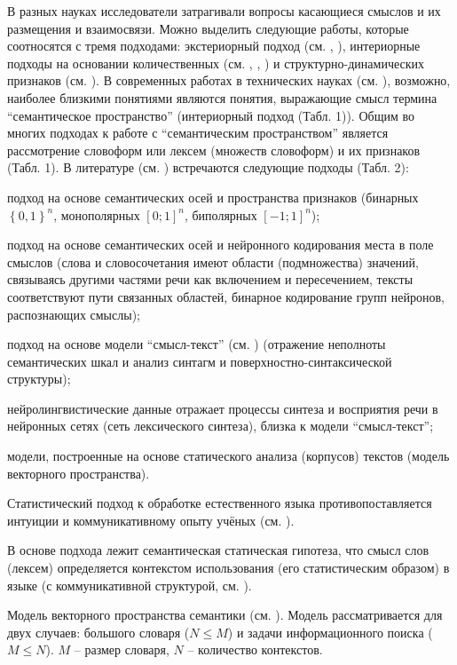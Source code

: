 В разных науках исследователи затрагивали вопросы касающиеся смыслов и их размещения и взаимосвязи. Можно выделить следующие работы, которые соотносятся с тремя подходами: экстериорный подход (см. , ), интериорные подходы на основании количественных (см. , , ) и структурно-динамических признаков (см. ).
В современных работах в технических науках (см. ), возможно, наиболее близкими понятиями являются понятия, выражающие смысл термина ``семантическое пространство'' (интериорный подход (Табл. 1)).
Общим во многих подходах к работе с ``семантическим пространством'' является рассмотрение словоформ или лексем (множеств словоформ) и их признаков (Табл. 1). В литературе (см. ) встречаются следующие подходы (Табл. 2):
\begin{textitemize}
	\item подход на основе семантических осей и пространства признаков (бинарных $\left\lbrace 0,1\right\rbrace ^{n}$, монополярных $\left[0;1\right]^{n}$, биполярных $\left[-1;1\right]^{n}$);
	\item подход на основе семантических осей и нейронного кодирования места в поле смыслов (слова и словосочетания имеют области (подмножества) значений, связываясь другими частями речи как включением и пересечением, тексты соответствуют пути связанных областей, бинарное кодирование групп нейронов, распознающих смыслы);
	\item подход на основе модели ``смысл-текст'' (см. ) (отражение неполноты семантических шкал и анализ синтагм и поверхностно-синтаксической структуры);
	\item нейролингвистические данные отражает процессы синтеза и восприятия речи в нейронных сетях (сеть лексического синтеза), близка к модели ``смысл‑текст'';
	\item модели, построенные на основе статического анализа (корпусов) текстов (модель векторного пространства).
\end{textitemize}
Статистический подход к обработке естественного языка противопоставляется интуиции и коммуникативному опыту учёных (см. ).

В основе подхода лежит семантическая статическая гипотеза, что смысл слов (лексем) определяется контекстом использования (его статистическим образом) в языке (с коммуникативной структурой, см. ).

Модель векторного пространства семантики (см. ). Модель рассматривается для двух случаев: большого словаря ($N\leq{M}$) и задачи информационного поиска ($M\leq{N}$). $M$ -- размер словаря, $N$ -- количество контекстов.

